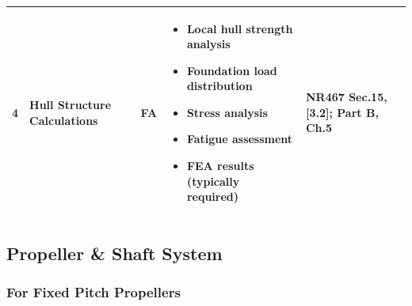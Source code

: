 \documentclass[11pt,a4paper]{report}
\newcommand{\fa}{\textbf{\textcolor{warningred}{FA}}}
\begin{document}
\begin{longtable}{|p{0.5cm}|p{5cm}|p{1.5cm}|p{5.5cm}|p{2cm}|}
4 & Hull Structure Calculations & \fa{} & 
\begin{itemize}[leftmargin=*,nosep]
\item Local hull strength analysis
\item Foundation load distribution
\item Stress analysis
\item Fatigue assessment
\item FEA results (typically required)
\end{itemize} & NR467 Sec.15, [3.2]; Part B, Ch.5 \\
\hline

\end{longtable}

\subsection{Propeller \& Shaft System}

\subsubsection{For Fixed Pitch Propellers}
\end{document}
